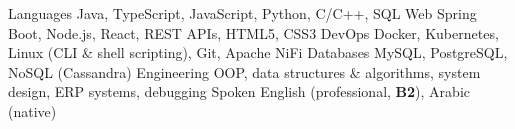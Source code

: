

\begingroup\small\sloppy
\renewcommand{\arraystretch}{1.15}
\begin{cvskills}

  \cvskill
    {Languages} %
    {Java, TypeScript, JavaScript, Python, C/C++, SQL} %
  \cvskill
    {Web} %
    {Spring Boot, Node.js, React, REST APIs, HTML5, CSS3} %
  \cvskill
    {DevOps} %
    {Docker, Kubernetes, Linux (CLI \& shell scripting), Git, Apache NiFi} %
  \cvskill
    {Databases} %
    {MySQL, PostgreSQL, NoSQL (Cassandra)} %
  \cvskill
    {Engineering} %
    {OOP, data structures \& algorithms, system design, ERP systems, debugging} %
  \cvskill
    {Spoken} %
    {English (professional, \textbf{B2}), Arabic (native)} %

\end{cvskills}
\endgroup
